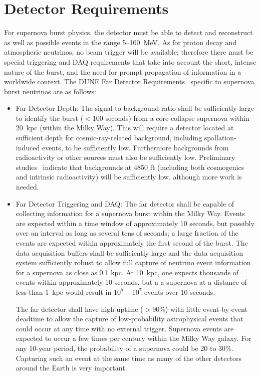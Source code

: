 \section{Detector Requirements}
\label{sec:physics-snblowe-detector-requirements}

For supernova burst physics, the detector must be able to detect and reconstruct as well as possible events in the range 5--100~MeV.  As for proton decay and atmospheric neutrinos, no beam trigger will be available; therefore there must be special triggering and DAQ requirements that take into account the short, intense nature of the burst, and the need for prompt propagation of information in a worldwide context.
The DUNE Far Detector
Requirements~\cite{lbnfdune-cdr-req} specific to supernova burst neutrinos are as follows:

\begin{itemize}

\item Far Detector Depth: The signal to background ratio shall be sufficiently large to identify the  burst ($<$100 seconds)  from a core-collapse supernova within 20~kpc (within the Milky Way). This will require a detector located at sufficient depth for cosmic-ray-related background, including spallation-induced events, to be sufficiently low.  Furthermore backgrounds from radioactivity or other sources must also be sufficiently low.  Preliminary studies~\cite{gehman} indicate that backgrounds at 4850 ft (including both cosmogenics and intrinsic radioactivity) will be sufficiently low, although more work is needed.

\item Far Detector Triggering and DAQ:  The far detector shall be capable of collecting information for a supernova burst within the Milky Way.  Events are expected within a time window of approximately 10 seconds, but possibly over an interval as long as several tens of seconds; a large fraction of the events are expected within approximately the first second of the burst.
The data acquisition buffers shall be sufficiently large and the data acquisition system sufficiently robust to allow full capture of neutrino event information for a supernova as close as 0.1 kpc.
At 10~kpc, one expects thousands of events within approximately 10 seconds, but a a supernova at a distance of less than 1~kpc would result in $10^5-10^7$  events over 10 seconds.    

The far detector shall have high uptime ($>$90\%) with little event-by-event deadtime to allow the capture of low-probability astrophysical events that could occur at any time with no external trigger. 
Supernova events are expected to occur a few times per century within the Milky Way galaxy. For any 10-year period, the probability of a supernova could be 20 to 30\%.  Capturing such an event at the same time as many of the other detectors around the Earth is very important.  


\end{itemize}
